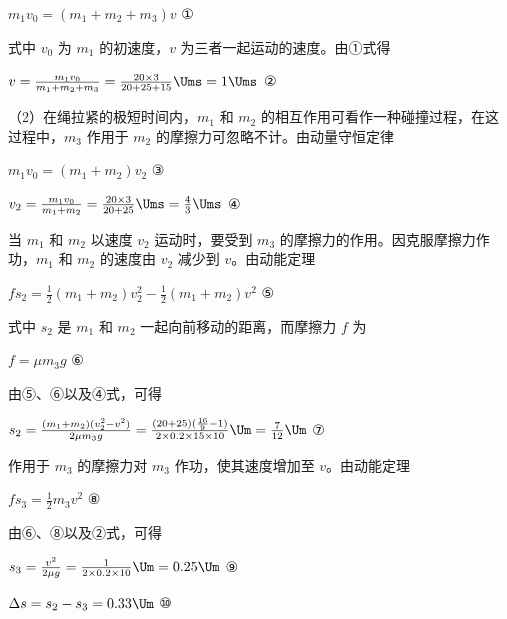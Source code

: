\documentclass[\gkver]{gaokaozhenti}
\begin{document}
\begin{enumerate}
{$m_{1}v_{0}=(m_{1}+m_{2}+m_{3})v$ ①

式中 $v_{0}$ 为 $m_{1}$ 的初速度，$v$ 为三者一起运动的速度。由①式得

$v=\frac{m_{1}v_{0}}{m_{1}+m_{2}+m_{3}}=\frac{20\times3}{20+25+15}\Ums=1\Ums$ ②

（2）在绳拉紧的极短时间内，$m_{1}$ 和 $m_{2}$ 的相互作用可看作一种碰撞过程，在这过程中，$m_{3}$ 作用于 $m_{2}$ 的摩擦力可忽略不计。由动量守恒定律

$m_{1}v_{0}=(m_{1}+m_{2})v_{2}$ ③

$v_{2}=\frac{m_{1}v_{0}}{m_{1}+m_{2}}=\frac{20\times3}{20+25}\Ums=\frac{4}{3}\Ums$ ④

当 $m_{1}$ 和 $m_{2}$ 以速度 $v_{2}$ 运动时，要受到 $m_{3}$ 的摩擦力的作用。因克服摩擦力作功，$m_{1}$ 和 $m_{2}$ 的速度由 $v_{2}$ 减少到 $v$。由动能定理

$fs_{2}=\frac{1}{2}(m_{1}+m_{2})v_{2}^{2}-\frac{1}{2}(m_{1}+m_{2})v^{2}$ ⑤

式中 $s_{2}$ 是 $m_{1}$ 和 $m_{2}$ 一起向前移动的距离，而摩擦力 $f$ 为

$f=\mu m_{3}g$ ⑥

由⑤、⑥以及④式，可得

$s_{2}=\frac{(m_{1}+m_{2})(v_{2}^{2}-v^{2})}{2\mu m_{3}g}=\frac{(20+25)(\frac{16}{9}-1)}{2\times0.2\times15\times10}\Um=\frac{7}{12}\Um$ ⑦

作用于 $m_{3}$ 的摩擦力对 $m_{3}$ 作功，使其速度增加至 $v$。由动能定理

$fs_{3}=\frac{1}{2}m_{3}v^{2}$ ⑧

由⑥、⑧以及②式，可得

$s_{3}=\frac{v^{2}}{2\mu g}=\frac{1}{2\times0.2\times10}\Um=0.25\Um$ ⑨

$\Delta s=s_{2}-s_{3}=0.33\Um$ ⑩
}

\end{enumerate}
\end{document}
